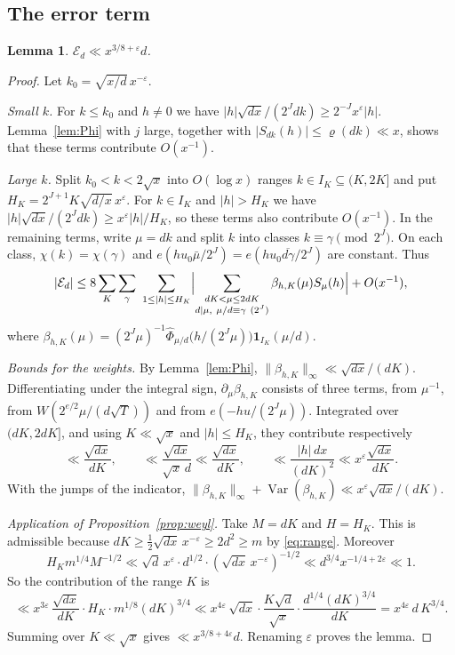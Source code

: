 \documentclass[11pt]{amsart}
\newtheorem{lemma}[theorem]{Lemma}
\theoremstyle{remark}
\theoremstyle{definition}
\numberwithin{equation}{section}
\newcommand{\eps}{\varepsilon}
\newcommand{\Var}{\operatorname{Var}}
\begin{document}
\subsection{The error term}

\begin{lemma}\label{lem:error}
$\mathcal E_d\ll x^{3/8+\eps}d$.
\end{lemma}

\begin{proof}
Let $k_0=\sqrt{x/d}\,x^{-\eps}$.

\emph{Small $k$.} For $k\le k_0$ and $h\ne0$ we have $|h|\sqrt{dx}/(2^Jdk)\ge2^{-J}x^{\eps}|h|$. Lemma~\ref{lem:Phi} with $j$ large, together with $|S_{dk}(h)|\le\varrho(dk)\ll x$, shows that these terms contribute $O(x^{-1})$.

\emph{Large $k$.} Split $k_0<k<2\sqrt x$ into $O(\log x)$ ranges $k\in I_K\subseteq(K,2K]$ and put $H_K=2^{J+1}K\sqrt{d/x}\,x^{\eps}$. For $k\in I_K$ and $|h|>H_K$ we have $|h|\sqrt{dx}/(2^Jdk)\ge x^{\eps}|h|/H_K$, so these terms also contribute $O(x^{-1})$. In the remaining terms, write $\mu=dk$ and split $k$ into classes $k\equiv\gamma\pmod{2^J}$. On each class, $\chi(k)=\chi(\gamma)$ and $e(hu_0\bar\mu/2^J)=e(hu_0\overline{d\gamma}/2^J)$ are constant. Thus
\[
|\mathcal E_d|\le8\sum_K\sum_{\gamma}\ \sum_{1\le|h|\le H_K}\Bigl|\sum_{\substack{dK<\mu\le2dK\\ d\mid\mu,\ \mu/d\equiv\gamma\ (2^J)}}\beta_{h,K}(\mu)S_\mu(h)\Bigr|+O(x^{-1}),
\]
where $\beta_{h,K}(\mu)=(2^J\mu)^{-1}\hat\Phi_{\mu/d}\bigl(h/(2^J\mu)\bigr)\mathbf1_{I_K}(\mu/d)$.

\emph{Bounds for the weights.} By Lemma~\ref{lem:Phi}, $\|\beta_{h,K}\|_\infty\ll\sqrt{dx}/(dK)$. Differentiating under the integral sign, $\partial_\mu\beta_{h,K}$ consists of three terms, from $\mu^{-1}$, from $W(2^{e/2}\mu/(d\sqrt T))$ and from $e(-hu/(2^J\mu))$. Integrated over $(dK,2dK]$, and using $K\ll\sqrt x$ and $|h|\le H_K$, they contribute respectively
\[
\ll\frac{\sqrt{dx}}{dK},\qquad\ll\frac{\sqrt{dx}}{\sqrt x\,d}\ll\frac{\sqrt{dx}}{dK},\qquad\ll\frac{|h|\,dx}{(dK)^2}\ll x^{\eps}\frac{\sqrt{dx}}{dK}.
\]
With the jumps of the indicator, $\|\beta_{h,K}\|_\infty+\Var(\beta_{h,K})\ll x^{\eps}\sqrt{dx}/(dK)$.

\emph{Application of Proposition~\ref{prop:weyl}.} Take $M=dK$ and $H=H_K$. This is admissible because $dK\ge\frac12\sqrt{dx}\,x^{-\eps}\ge2d^2\ge m$ by \eqref{eq:range}. Moreover
\[
H_Km^{1/4}M^{-1/2}\ll\sqrt d\,x^{\eps}\cdot d^{1/2}\cdot(\sqrt{dx}\,x^{-\eps})^{-1/2}\ll d^{3/4}x^{-1/4+2\eps}\ll1 .
\]
So the contribution of the range $K$ is
\[
\ll x^{3\eps}\,\frac{\sqrt{dx}}{dK}\cdot H_K\cdot m^{1/8}(dK)^{3/4}\ll x^{4\eps}\,\sqrt{dx}\cdot\frac{K\sqrt d}{\sqrt x}\cdot\frac{d^{1/4}(dK)^{3/4}}{dK}=x^{4\eps}\,d\,K^{3/4}.
\]
Summing over $K\ll\sqrt x$ gives $\ll x^{3/8+4\eps}d$. Renaming $\eps$ proves the lemma.
\end{proof}
\end{document}
